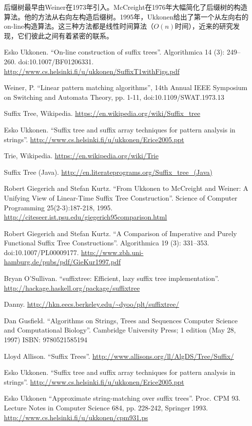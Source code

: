 \documentclass{ctexart}
\begin{document}
后缀树最早由Weiner在1973年引入\cite{weiner73}。McCreight在1976年大幅简化了后缀树的构造算法。他的方法从右向左构造后缀树。1995年，Ukkonen给出了第一个从左向右的on-line构造算法。这三种方法都是线性时间算法（$O(n)$时间），近来的研究发现，它们彼此之间有着紧密的联系\cite{GieKur97}。

\ifx\wholebook\relax \else
\begin{thebibliography}{99}

Esko Ukkonen. ``On-line construction of suffix trees''. Algorithmica 14 (3): 249--260. doi:10.1007/BF01206331. \url{http://www.cs.helsinki.fi/u/ukkonen/SuffixT1withFigs.pdf}

Weiner, P. ``Linear pattern matching algorithms'', 14th Annual IEEE Symposium on Switching and Automata Theory, pp. 1-11, doi:10.1109/SWAT.1973.13

Suffix Tree, Wikipedia. \url{https://en.wikipedia.org/wiki/Suffix_tree}

Esko Ukkonen. ``Suffix tree and suffix array techniques for pattern analysis in strings''. \url{http://www.cs.helsinki.fi/u/ukkonen/Erice2005.ppt}

Trie, Wikipedia. \url{https://en.wikipedia.org/wiki/Trie}

Suffix Tree (Java). \url{http://en.literateprograms.org/Suffix_tree_(Java)}

Robert Giegerich and Stefan Kurtz. ``From Ukkonen to McCreight and Weiner: A Unifying View of Linear-Time Suffix Tree Construction''. Science of Computer Programming 25(2-3):187-218, 1995. \url{http://citeseer.ist.psu.edu/giegerich95comparison.html}

Robert Giegerich and Stefan Kurtz. ``A Comparison of Imperative and Purely Functional Suffix Tree Constructions''. Algorithmica 19 (3): 331--353. doi:10.1007/PL00009177. \url{http://www.zbh.uni-hamburg.de/pubs/pdf/GieKur1997.pdf}

Bryan O'Sullivan. ``suffixtree: Efficient, lazy suffix tree implementation''. \url{http://hackage.haskell.org/package/suffixtree}

Danny. \url{http://hkn.eecs.berkeley.edu/~dyoo/plt/suffixtree/}

Dan Gusfield. ``Algorithms on Strings, Trees and Sequences Computer Science and Computational Biology''. Cambridge University Press; 1 edition (May 28, 1997) ISBN: 9780521585194

Lloyd Allison. ``Suffix Trees''. \url{http://www.allisons.org/ll/AlgDS/Tree/Suffix/}

Esko Ukkonen. ``Suffix tree and suffix array techniques for pattern analysis in strings''. \url{http://www.cs.helsinki.fi/u/ukkonen/Erice2005.ppt}

Esko Ukkonen ``Approximate string-matching over suffix trees''. Proc. CPM 93. Lecture Notes in Computer Science 684, pp. 228-242, Springer 1993. \url{http://www.cs.helsinki.fi/u/ukkonen/cpm931.ps}

\end{thebibliography}
\end{document}
